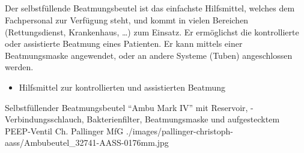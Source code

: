 \subsection{}
\label{topic:beatmungsbeutel}



\Text{\TxBeschreibung}
{Der selbstfüllende Beatmungsbeutel ist das einfachste
Hilfsmittel, welches dem Fachpersonal zur Verfügung steht, und kommt in
vielen Bereichen (Rettungsdienst, Krankenhaus, \ldots) zum
Einsatz. Er ermöglichst die kontrollierte oder
assistierte Beatmung eines Patienten. Er kann mittels
einer Beatmungsmaske angewendet, oder an
andere Systeme (Tuben) angeschlossen werden. }
{%
\begin{itemize}
  \item Hilfsmittel zur kontrollierten und assistierten Beatmung
\end{itemize}
}
{}
{}
{}



\PictureWide
{Selbstfüllender Beatmungsbeutel
\enquote{Ambu{\texttrademark} Mark IV} mit Reservoir, -Verbindungsschlauch,
Bakterienfilter, Beatmungsmaske und aufgestecktem PEEP-Ventil}%
{}%
{}%
{Ch. Pallinger}%
{MfG}%
{./images/pallinger-christoph-aass/Ambubeutel_32741-AASS-0176mm.jpg}%
{}%
{}%


